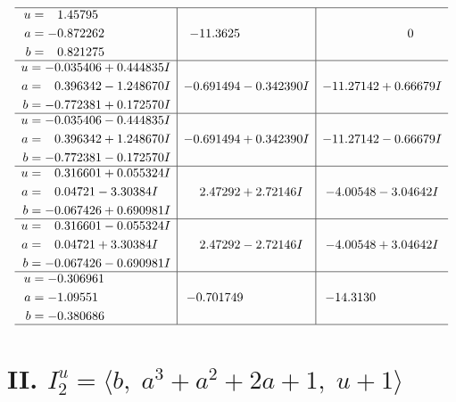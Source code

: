 \documentclass[1p]{elsarticle_modified}
\theoremstyle{definition}
\begin{document}
$$\begin{array}{c|c|c}
 \hline 
\begin{aligned}
u &= \phantom{-}1.45795\phantom{ +0.000000I} \\
a &= -0.872262\phantom{ +0.000000I} \\
b &= \phantom{-}0.821275\phantom{ +0.000000I}\end{aligned}
 & -11.3625\phantom{ +0.000000I} & \phantom{-0.000000 } 0 \\ \hline\begin{aligned}
u &= -0.035406 + 0.444835 I \\
a &= \phantom{-}0.396342 - 1.248670 I \\
b &= -0.772381 + 0.172570 I\end{aligned}
 & -0.691494 - 0.342390 I & -11.27142 + 0.66679 I \\ \hline\begin{aligned}
u &= -0.035406 - 0.444835 I \\
a &= \phantom{-}0.396342 + 1.248670 I \\
b &= -0.772381 - 0.172570 I\end{aligned}
 & -0.691494 + 0.342390 I & -11.27142 - 0.66679 I \\ \hline\begin{aligned}
u &= \phantom{-}0.316601 + 0.055324 I \\
a &= \phantom{-}0.04721 - 3.30384 I \\
b &= -0.067426 + 0.690981 I\end{aligned}
 & \phantom{-}2.47292 + 2.72146 I & -4.00548 - 3.04642 I \\ \hline\begin{aligned}
u &= \phantom{-}0.316601 - 0.055324 I \\
a &= \phantom{-}0.04721 + 3.30384 I \\
b &= -0.067426 - 0.690981 I\end{aligned}
 & \phantom{-}2.47292 - 2.72146 I & -4.00548 + 3.04642 I \\ \hline\begin{aligned}
u &= -0.306961\phantom{ +0.000000I} \\
a &= -1.09551\phantom{ +0.000000I} \\
b &= -0.380686\phantom{ +0.000000I}\end{aligned}
 & -0.701749\phantom{ +0.000000I} & -14.3130\phantom{ +0.000000I}\\
 \hline 
 \end{array}$$\newpage\newpage\renewcommand{\arraystretch}{1}
\centering \section*{II. $I^u_{2}= \langle b,\;a^3+a^2+2 a+1,\;u+1 \rangle$}
\end{document}
